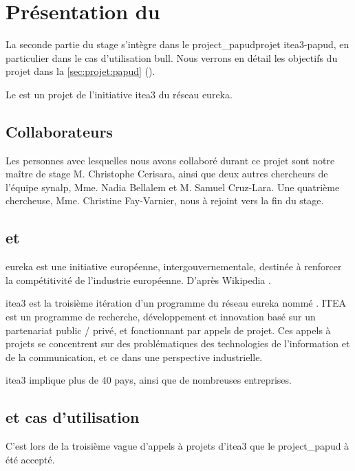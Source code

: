 \chapter{Présentation du }
La seconde partie du stage s'intègre dans le \gls{project_papud}{projet \gls{itea3}-\gls{papud}, en particulier dans le cas d'utilisation \gls{bull}}. Nous verrons en détail les objectifs du projet dans la \autoref{sec:projet:papud} ().

Le  est un projet de l'initiative \gls{itea3} du réseau \gls{eureka}.

\section{Collaborateurs}\label{sec:papud_colabo}
Les personnes avec lesquelles nous avons collaboré durant ce projet sont notre maître de stage M. Christophe Cerisara, ainsi que deux autres chercheurs de l'équipe \gls{synalp}, Mme. Nadia Bellalem et M. Samuel Cruz-Lara.
Une quatrième chercheuse, Mme. Christine Fay-Varnier, nous à rejoint vers la fin du stage.

\section{ et }
\og\gls{eureka} est une initiative européenne, intergouvernementale, destinée à renforcer la compétitivité de l’industrie européenne.\fg{} D'après Wikipedia \autocite{wiki_eureka}.

\gls{itea3} est la troisième itération d'un programme du réseau \gls{eureka} nommé .
ITEA est un programme de recherche, développement et innovation basé sur un partenariat public / privé, et fonctionnant par appels de projet.
Ces appels à projets se concentrent sur des problématiques des technologies de l'information et de la communication, et ce dans une perspective industrielle.

\gls{itea3} implique plus de 40 pays, ainsi que de nombreuses entreprises.

\section{ et cas d'utilisation }
C'est lors de la troisième vague d'appels à projets d'\gls{itea3} que le  \gls{project_papud} à été accepté.

